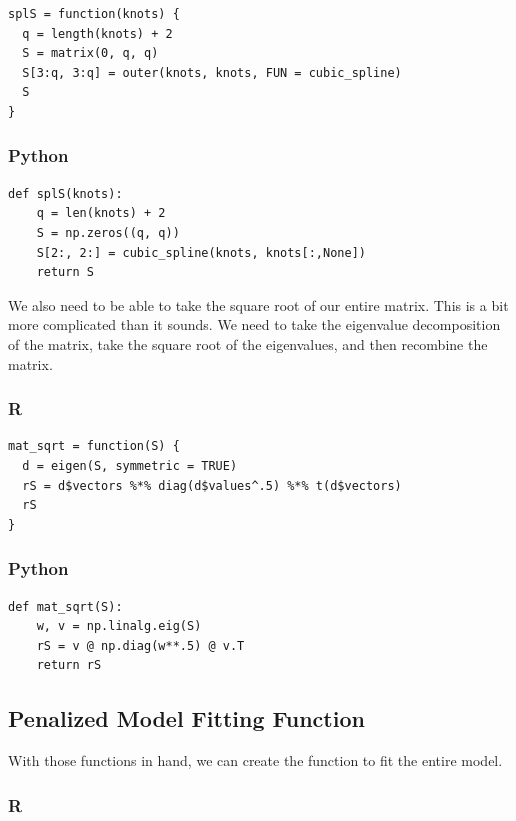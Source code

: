 \documentclass[
  letterpaper,
]{krantz}
\begin{document}
\begin{verbatim}
splS = function(knots) {
  q = length(knots) + 2
  S = matrix(0, q, q) 
  S[3:q, 3:q] = outer(knots, knots, FUN = cubic_spline)
  S
}
\end{verbatim}

\subsubsection{Python}

\begin{verbatim}
def splS(knots):
    q = len(knots) + 2
    S = np.zeros((q, q))
    S[2:, 2:] = cubic_spline(knots, knots[:,None])
    return S
\end{verbatim}

We also need to be able to take the square root of our entire matrix.
This is a bit more complicated than it sounds. We need to take the
eigenvalue decomposition of the matrix, take the square root of the
eigenvalues, and then recombine the matrix.

\subsubsection{R}

\begin{verbatim}
mat_sqrt = function(S) {
  d = eigen(S, symmetric = TRUE)
  rS = d$vectors %*% diag(d$values^.5) %*% t(d$vectors)
  rS
}
\end{verbatim}

\subsubsection{Python}

\begin{verbatim}
def mat_sqrt(S):
    w, v = np.linalg.eig(S)
    rS = v @ np.diag(w**.5) @ v.T
    return rS
\end{verbatim}

\subsection{Penalized Model Fitting
Function}\label{sec-gam-penalty-model}

With those functions in hand, we can create the function to fit the
entire model.

\subsubsection{R}
\end{document}
